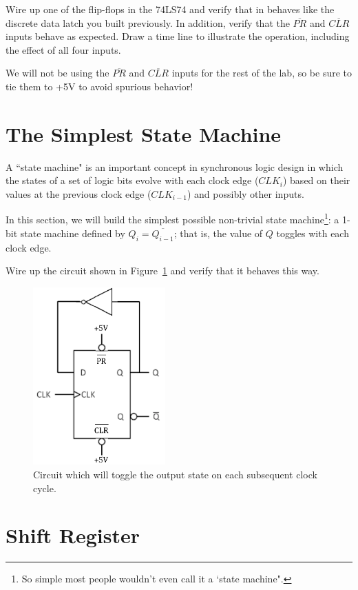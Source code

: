 \documentclass[12pt]{article}
\begin{document}
Wire up one of the flip-flops in the 74LS74 and verify that in behaves like the discrete data latch you built previously.  In addition,
verify that the $\overline{PR}$ and $\overline{CLR}$ inputs behave as expected.  Draw a time line to illustrate the operation, including the effect of all four inputs.

We will not be using the $\overline{PR}$ and $\overline{CLR}$ inputs for the rest of the lab, so be sure to tie them to +5V
to avoid spurious behavior!

\section*{The Simplest State Machine}

A ``state machine" is an important concept in synchronous logic design in which the states of a set of logic bits evolve with each clock edge ($CLK_i$) based on their
values at the previous clock edge ($CLK_{i-1}$) and possibly other inputs.

In this section, we will build the simplest possible non-trivial state machine\footnote{So simple most people wouldn't even call it a `state machine".}: a 1-bit state machine defined by $Q_{i}=\overline{Q_{i-1}}$; that is, the value of $Q$ toggles with each clock edge.  

Wire up the circuit shown in Figure~\ref{fig:toggler} and verify that it behaves this way.

\begin{figure}[!h]
\centerline{\includegraphics[width=2in]{figs/toggler.pdf}}
\caption{Circuit which will toggle the output state on each subsequent clock cycle.}
\label{fig:toggler}
\end{figure}

\section*{Shift Register}
\end{document}

